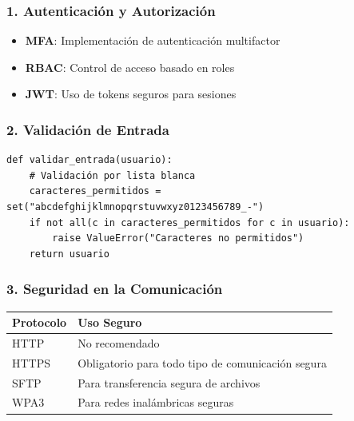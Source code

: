 \documentclass[12pt,a4paper]{article}
\begin{document}
\subsubsection{1. Autenticación y Autorización}
\begin{center}
\end{center}

\begin{itemize}
    \item \textbf{MFA}: Implementación de autenticación multifactor
    \item \textbf{RBAC}: Control de acceso basado en roles
    \item \textbf{JWT}: Uso de tokens seguros para sesiones
\end{itemize}

\subsubsection{2. Validación de Entrada}
\begin{verbatim}
def validar_entrada(usuario):
    # Validación por lista blanca
    caracteres_permitidos = set("abcdefghijklmnopqrstuvwxyz0123456789_-")
    if not all(c in caracteres_permitidos for c in usuario):
        raise ValueError("Caracteres no permitidos")
    return usuario
\end{verbatim}

\subsubsection{3. Seguridad en la Comunicación}
\begin{center}
\begin{tabular}{|l|p{8cm}|}
\hline
\textbf{Protocolo} & \textbf{Uso Seguro} \\ \hline
HTTP & No recomendado \\
HTTPS & Obligatorio para todo tipo de comunicación segura \\
SFTP & Para transferencia segura de archivos \\
WPA3 & Para redes inalámbricas seguras \\ \hline
\end{tabular}
\end{center}
\end{document}
